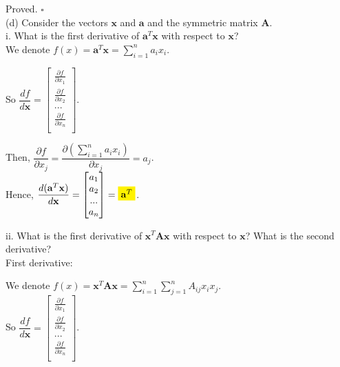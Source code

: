 \documentclass[12pt]{article}
\begin{document}
Proved. $\square$\\



\noindent (d) Consider the vectors $\mathbf{x}$ and $\mathbf{a}$ and the symmetric matrix $\mathbf{A}$.\\

i. What is the first derivative of $\mathbf{a}^T\mathbf{x}$ with respect to $\mathbf{x}$?\\

We denote $f(x) = \mathbf{a}^T\mathbf{x} = \sum_{i = 1}^n a_i x_i$.

So $\dfrac{df}{d\mathbf{x}} = \begin{bmatrix} \frac{\partial f}{\partial x_1} \\ \frac{\partial f}{\partial x_2} \\ ... \\ \frac{\partial f}{\partial x_n} \\ \end{bmatrix}$.\\
\vspace{1em}

Then, $\dfrac{\partial f}{\partial x_j} =  \dfrac{\partial(\sum_{i = 1}^n a_i x_i)}{\partial x_j} = a_j$.\\

Hence, $\dfrac{d(\mathbf{a}^T\mathbf{x})}{d\mathbf{x}} = \begin{bmatrix} a_1 \\ a_2 \\ ... \\ a_n \\ \end{bmatrix} = \colorbox{yellow}{$\mathbf{a}^T$}$.\\
\vspace{1.5em}

ii. What is the first derivative of $\mathbf{x}^T \mathbf{Ax}$ with respect to $\mathbf{x}$? What is the second derivative?\\

First derivative:

We denote $f(x) = \mathbf{x}^T\mathbf{Ax} = \sum_{i = 1}^n \sum_{j = 1}^n A_{ij} x_i x_j$.\\

So $\dfrac{df}{d\mathbf{x}} = \begin{bmatrix} \frac{\partial f}{\partial x_1} \\ \frac{\partial f}{\partial x_2} \\ ... \\ \frac{\partial f}{\partial x_n} \\ \end{bmatrix}$.\\
\vspace{1em}
\end{document}

